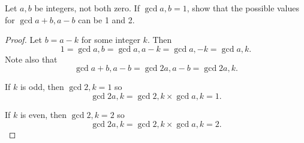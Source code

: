 \begin{problem}
    Let $a, b$ be integers, not both zero. If $\gcd{a, b} = 1$, show that the possible values for $\gcd{a+b, a-b}$ can be 1 and 2.
\end{problem}
\begin{proof}
    Let $b = a - k$ for some integer $k$. Then \[1 = \gcd{a, b} = \gcd{a, a-k} = \gcd{a, -k} = \gcd{a, k}.\] Note also that \[\gcd{a+b, a-b} = \gcd{2a, a-b} = \gcd{2a, k}.\]

    If $k$ is odd, then $\gcd{2, k} = 1$ so \[\gcd{2a, k} = \gcd{2, k} \times \gcd{a, k} = 1.\]

    If $k$ is even, then $\gcd{2, k} = 2$ so \[\gcd{2a, k} = \gcd{2, k} \times \gcd{a, k} = 2.\]
\end{proof}
